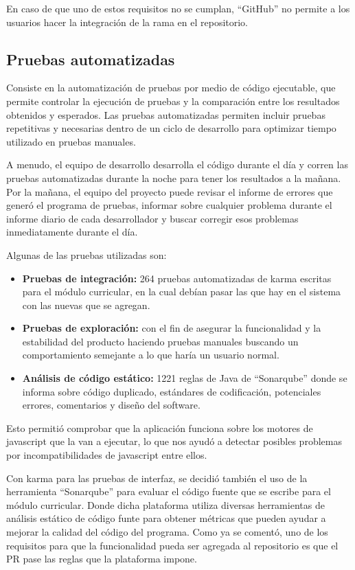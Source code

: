 En caso de que uno de estos requisitos no se cumplan, \enquote{GitHub} no permite a los usuarios hacer la integración de la rama en el repositorio.

\subsection{Pruebas automatizadas}
Consiste en la automatización de pruebas por medio de código ejecutable, que permite controlar la ejecución de pruebas y la comparación entre los resultados obtenidos y esperados. Las pruebas automatizadas permiten incluir pruebas repetitivas y necesarias dentro de un ciclo de desarrollo para optimizar tiempo utilizado en pruebas manuales\citep{crispin2009agile}.

A menudo, el equipo de desarrollo desarrolla el código durante el día y corren las pruebas automatizadas durante la noche para tener los resultados a la mañana. Por la mañana, el equipo del proyecto puede revisar el informe de errores que generó el programa de pruebas, informar sobre cualquier problema durante el informe diario de cada desarrollador y buscar corregir esos problemas inmediatamente durante el día.

Algunas de las pruebas utilizadas son:
\begin{itemize}
	\item \textbf{Pruebas de integración:} 264 pruebas automatizadas de karma escritas para el módulo curricular, en la cual debían pasar las que hay en el sistema con las nuevas que se agregan.
	\item \textbf{Pruebas de exploración:} con el fin de asegurar la funcionalidad y la estabilidad del producto haciendo pruebas manuales buscando un comportamiento semejante a lo que haría un usuario normal.
	\item \textbf{Análisis de código estático:} 1221 reglas de Java de \enquote{Sonarqube} donde se informa sobre código duplicado, estándares de codificación, potenciales errores, comentarios y diseño del software.
\end{itemize}

Esto permitió comprobar que la aplicación funciona sobre los motores de javascript que la van a ejecutar, lo que nos ayudó a detectar posibles problemas por incompatibilidades de javascript entre ellos.

Con karma para las pruebas de interfaz, se decidió también el uso de la herramienta \enquote{Sonarqube} para evaluar el código fuente que se escribe para el módulo curricular. Donde dicha plataforma utiliza diversas herramientas de análisis estático de código funte para obtener métricas que pueden ayudar a mejorar la calidad del código del programa. Como ya se comentó, uno de los requisitos para que la funcionalidad pueda ser agregada al repositorio es que el PR pase las reglas que la plataforma impone.

